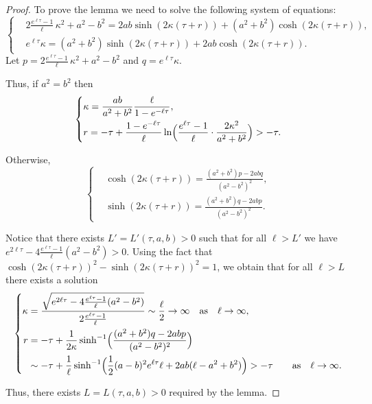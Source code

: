 \documentclass[JEP,XML,SOM,Unicode,NoFloatCountersInSection]{cedram}
\theoremstyle{definition}
\renewcommand{\>}{{\rangle}}
\newcommand{\<}{{\langle}}
\begin{document}
\begin{proof}
To prove the lemma we need to solve the following system of equations:\vspace*{-3pt}
\begin{equation*}
\left\{
\begin{aligned}
&2\frac{e^{\ell \tau}-1}{\ell}\,\kappa^2+a^2-b^2 = 2ab\sinh(2\kappa(\tau+r))+(a^2+b^2)\cosh(2\kappa(\tau+r)),\\
& e^{\ell\tau}\kappa = (a^2+b^2)\sinh(2\kappa(\tau+r))+2 ab\cosh(2\kappa(\tau+r)).
\end{aligned}
\right.
\end{equation*}
Let $p=2\frac{e^{\ell \tau}-1}{\ell}\,\kappa^2+a^2-b^2$ and $q=e^{\ell\tau}\kappa$.

Thus, if $a^2=b^2$ then
\begin{equation*}
\left\{
\begin{aligned}
&\kappa = \frac{ab}{a^2+b^2}\frac{\ell}{1-e^{-\ell\tau}}, \\
& r = -\tau+\frac{1-e^{-\ell\tau}}{\ell}\ln\Bigl(\frac{e^{\ell\tau}-1}{\ell}\cdot\frac{2\kappa^2}{a^2+b^2}\Bigr)>-\tau.
\end{aligned}
\right.
\end{equation*}

Otherwise,
\begin{equation*}
\left\{
\begin{aligned}
&\cosh(2\kappa(\tau+r)) = \frac{(a^2+b^2)p-2abq}{(a^2-b^2)^2}, \\
&\sinh(2\kappa(\tau+r)) = \frac{(a^2+b^2)q-2abp}{(a^2-b^2)^2}.
\end{aligned}
\right.
\end{equation*}

Notice that there exists $L'=L'(\tau, a, b)>0$ such that for all $\ell>L'$ we have $e^{2\ell\tau}-4\frac{e^{\ell\tau}-1}{\ell}(a^2-b^2)>0$. Using the fact that $\cosh(2\kappa(\tau+r))^2-\sinh(2\kappa(\tau+r))^2=1$, we obtain that for all $\ell>L$ there exists a solution
\begin{equation*}
\left\{
\begin{aligned}
\kappa &= \frac{\sqrt{e^{2\ell\tau}-4\frac{e^{\ell\tau}-1}{\ell}(a^2-b^2)}}{2\frac{e^{\ell\tau}-1}{\ell}}\sim\frac{\ell}{2}\to \infty \quad \text{as}\quad \ell\to\infty, \\
r &=-\tau+\frac{1}{2\kappa} \sinh^{-1} \Bigl(\frac{(a^2+b^2)q-2abp}{(a^2-b^2)^2} \Bigr)\\&\sim-\tau+\frac{1}{\ell}\sinh^{-1} \Bigl(\frac{1}{2}(a-b)^2e^{\ell\tau}\ell+2ab(\ell-a^2+b^2) \Bigr)>-\tau\quad \quad \text{as}\quad \ell\to\infty.
\end{aligned}
\right.
\end{equation*}

Thus, there exists $L=L(\tau,a,b)>0$ required by the lemma.
\end{proof}
\end{document}
